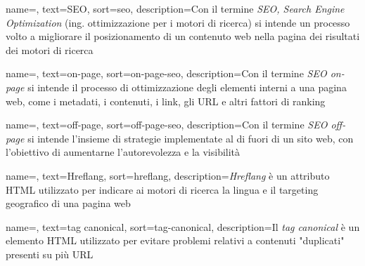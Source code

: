 






 {
    name=,
    text=SEO,
    sort=seo,
    description={Con il termine \emph{SEO, Search Engine Optimization} (ing. ottimizzazione per i motori di ricerca) si intende un processo volto a migliorare il posizionamento di un contenuto web nella pagina dei risultati dei motori di ricerca}
}

 {
    name=,
    text=on-page,
    sort=on-page-seo,
    description={Con il termine \emph{SEO on-page} si intende il processo di ottimizzazione degli elementi interni a una pagina web, come i metadati, i contenuti, i link, gli URL e altri fattori di ranking}
}

 {
    name=,
    text=off-page,
    sort=off-page-seo,
    description={Con il termine \emph{SEO off-page} si intende l'insieme di strategie implementate al di fuori di un sito web, con l'obiettivo di aumentarne l'autorevolezza e la visibilità}
}

 {
    name=,
    text=Hreflang,
    sort=hreflang,
    description={\emph{Hreflang} è un attributo HTML utilizzato per indicare ai motori di ricerca la lingua e il targeting geografico di una pagina web}
}

 {
    name=,
    text=tag canonical,
    sort=tag-canonical,
    description={Il \emph{tag canonical} è un elemento HTML utilizzato per evitare problemi relativi a contenuti "duplicati" presenti su più URL}
}

